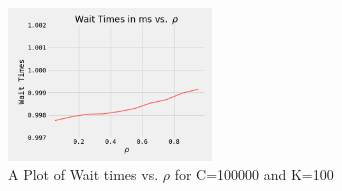 \begin{figure}
 \centering
 \captionsetup{justification=centering}
 \begin{center}
  \includegraphics[width=0.48\textwidth]{Figures/task4.png}
 \end{center}
 \caption{A Plot of Wait times vs. $\rho$ for C=100000 and K=100}
 \label{fig7}
\end{figure}